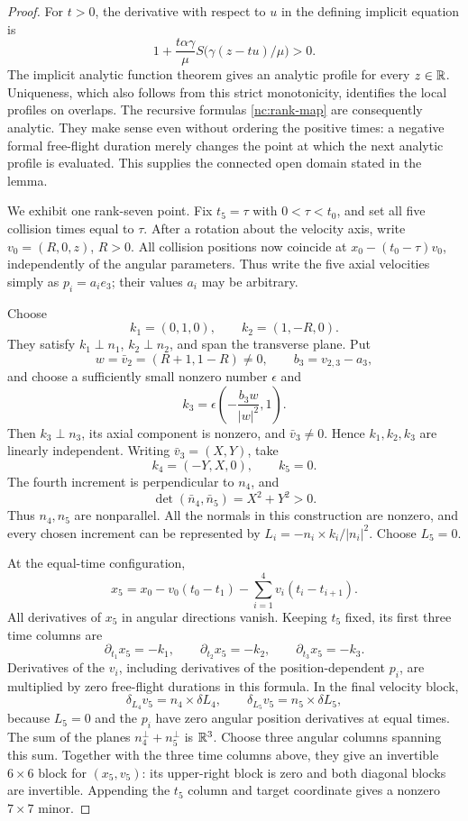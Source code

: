 \begin{proof}
For \(t>0\), the derivative with respect to \(u\) in the defining
implicit equation is
\[
 1+\frac{t\alpha\gamma}{\mu}
 S\bigl(\gamma(z-tu)/\mu\bigr)>0.
\]
The implicit analytic function theorem gives an analytic profile
for every \(z\in\mathbb R\).  Uniqueness, which also follows from this
strict monotonicity, identifies the local profiles on overlaps.
The recursive formulas \eqref{nc:rank-map} are consequently
analytic.  They make sense even without ordering the positive
times: a negative formal free-flight duration merely changes
the point at which the next analytic profile is evaluated.
This supplies the connected open domain stated in the lemma.

We exhibit one rank-seven point.  Fix \(t_5=\tau\) with
\(0<\tau<t_0\), and set all five collision times equal to
\(\tau\).  After a rotation about the velocity axis, write
\(v_0=(R,0,z)\), \(R>0\).  All collision positions now coincide
at \(x_0-(t_0-\tau)v_0\), independently of the angular parameters.
Thus write the five axial velocities simply as \(p_i=a_i e_3\);
their values \(a_i\) may be arbitrary.

Choose
\[
 k_1=(0,1,0),\qquad k_2=(1,-R,0).
\]
They satisfy \(k_1\perp n_1\), \(k_2\perp n_2\), and span the
transverse plane.  Put
\[
 w=\bar v_2=(R+1,1-R)\ne0,\qquad b_3=v_{2,3}-a_3,
\]
and choose a sufficiently small nonzero number \(\epsilon\) and
\[
 k_3=\epsilon\left(-\frac{b_3w}{|w|^2},1\right).
\]
Then \(k_3\perp n_3\), its axial component is nonzero, and
\(\bar v_3\ne0\).  Hence \(k_1,k_2,k_3\) are linearly independent.
Writing \(\bar v_3=(X,Y)\), take
\[
 k_4=(-Y,X,0),\qquad k_5=0.
\]
The fourth increment is perpendicular to \(n_4\), and
\[
 \det(\bar n_4,\bar n_5)=X^2+Y^2>0.
\]
Thus \(n_4,n_5\) are nonparallel.  All the normals in this
construction are nonzero, and every chosen increment can be
represented by \(L_i=-n_i\times k_i/|n_i|^2\).  Choose \(L_5=0\).

At the equal-time configuration,
\[
 x_5=x_0-v_0(t_0-t_1)
           -\sum_{i=1}^4v_i(t_i-t_{i+1}).
\]
All derivatives of \(x_5\) in angular directions vanish.
Keeping \(t_5\) fixed, its first three time columns are
\[
 \partial_{t_1}x_5=-k_1,\qquad
 \partial_{t_2}x_5=-k_2,\qquad
 \partial_{t_3}x_5=-k_3.
\]
Derivatives of the \(v_i\), including derivatives of the
position-dependent \(p_i\), are multiplied by zero free-flight
durations in this formula.  In the final velocity block,
\[
 \delta_{L_4}v_5=n_4\times\delta L_4,\qquad
 \delta_{L_5}v_5=n_5\times\delta L_5,
\]
because \(L_5=0\) and the \(p_i\) have zero angular position
derivatives at equal times.  The sum of the planes
\(n_4^\perp+n_5^\perp\) is \(\mathbb R^3\).  Choose three angular
columns spanning this sum.  Together with the three time columns
above, they give an invertible \(6\times6\) block for
\((x_5,v_5)\): its upper-right block is zero and both diagonal
blocks are invertible.  Appending the \(t_5\) column and target
coordinate gives a nonzero \(7\times7\) minor.


\end{proof}
